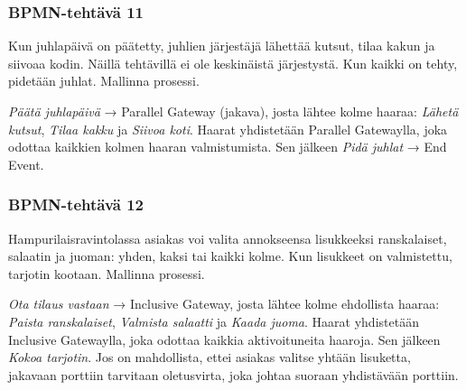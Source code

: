 \documentclass[
  finnish,
  letterpaper,
  DIV=11,
  numbers=noendperiod,
  oneside]{scrreprt}
\begin{document}
\subsubsection{BPMN-tehtävä 11}\label{bpmn-tehtuxe4vuxe4-11}

Kun juhlapäivä on päätetty, juhlien järjestäjä lähettää kutsut, tilaa
kakun ja siivoaa kodin. Näillä tehtävillä ei ole keskinäistä
järjestystä. Kun kaikki on tehty, pidetään juhlat. Mallinna prosessi.

\begin{tcolorbox}[enhanced jigsaw, arc=.35mm, bottomrule=.15mm, bottomtitle=1mm, breakable, colback=white, colbacktitle=quarto-callout-tip-color!10!white, colframe=quarto-callout-tip-color-frame, coltitle=black, left=2mm, leftrule=.75mm, opacityback=0, opacitybacktitle=0.6, rightrule=.15mm, title=\textcolor{quarto-callout-tip-color}{\faLightbulb}\hspace{0.5em}{Malliratkaisu}, titlerule=0mm, toprule=.15mm, toptitle=1mm]

\emph{Päätä juhlapäivä} → Parallel Gateway (jakava), josta lähtee kolme
haaraa: \emph{Lähetä kutsut}, \emph{Tilaa kakku} ja \emph{Siivoa koti}.
Haarat yhdistetään Parallel Gatewaylla, joka odottaa kaikkien kolmen
haaran valmistumista. Sen jälkeen \emph{Pidä juhlat} → End Event.

\end{tcolorbox}

\subsubsection{BPMN-tehtävä 12}\label{bpmn-tehtuxe4vuxe4-12}

Hampurilaisravintolassa asiakas voi valita annokseensa lisukkeeksi
ranskalaiset, salaatin ja juoman: yhden, kaksi tai kaikki kolme. Kun
lisukkeet on valmistettu, tarjotin kootaan. Mallinna prosessi.

\begin{tcolorbox}[enhanced jigsaw, arc=.35mm, bottomrule=.15mm, bottomtitle=1mm, breakable, colback=white, colbacktitle=quarto-callout-tip-color!10!white, colframe=quarto-callout-tip-color-frame, coltitle=black, left=2mm, leftrule=.75mm, opacityback=0, opacitybacktitle=0.6, rightrule=.15mm, title=\textcolor{quarto-callout-tip-color}{\faLightbulb}\hspace{0.5em}{Malliratkaisu}, titlerule=0mm, toprule=.15mm, toptitle=1mm]

\emph{Ota tilaus vastaan} → Inclusive Gateway, josta lähtee kolme
ehdollista haaraa: \emph{Paista ranskalaiset}, \emph{Valmista salaatti}
ja \emph{Kaada juoma}. Haarat yhdistetään Inclusive Gatewaylla, joka
odottaa kaikkia aktivoituneita haaroja. Sen jälkeen \emph{Kokoa
tarjotin}. Jos on mahdollista, ettei asiakas valitse yhtään lisuketta,
jakavaan porttiin tarvitaan oletusvirta, joka johtaa suoraan yhdistävään
porttiin.

\end{tcolorbox}
\end{document}
